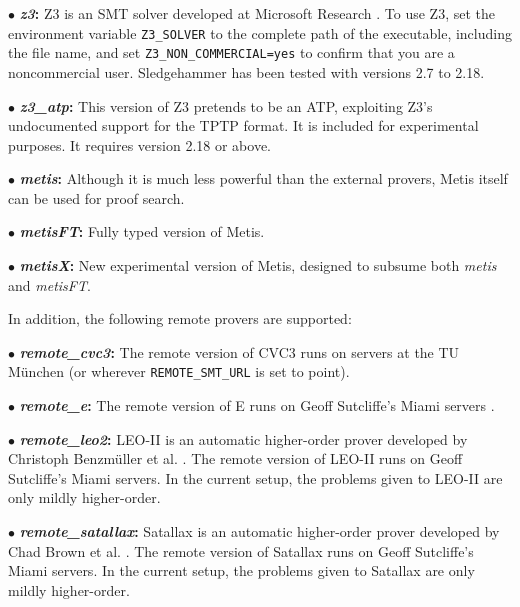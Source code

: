 \documentclass[a4paper,12pt]{article}
\begin{document}
\begin{enum}
\begin{enum}
\item[$\bullet$] \textbf{\textit{z3}:} Z3 is an SMT solver developed at
Microsoft Research \cite{z3}. To use Z3, set the environment variable
\texttt{Z3\_SOLVER} to the complete path of the executable, including the file
name, and set \texttt{Z3\_NON\_COMMERCIAL=yes} to confirm that you are a
noncommercial user. Sledgehammer has been tested with versions 2.7 to 2.18.

\item[$\bullet$] \textbf{\textit{z3\_atp}:} This version of Z3 pretends to be an
ATP, exploiting Z3's undocumented support for the TPTP format. It is included
for experimental purposes. It requires version 2.18 or above.

\item[$\bullet$] \textbf{\textit{metis}:} Although it is much less powerful than
the external provers, Metis itself can be used for proof search.

\item[$\bullet$] \textbf{\textit{metisFT}:} Fully typed version of Metis.

\item[$\bullet$] \textbf{\textit{metisX}:} New experimental version of Metis,
designed to subsume both \textit{metis} and \textit{metisFT}.
\end{enum}

In addition, the following remote provers are supported:

\begin{enum}
\item[$\bullet$] \textbf{\textit{remote\_cvc3}:} The remote version of CVC3 runs
on servers at the TU M\"unchen (or wherever \texttt{REMOTE\_SMT\_URL} is set to
point).

\item[$\bullet$] \textbf{\textit{remote\_e}:} The remote version of E runs
on Geoff Sutcliffe's Miami servers \cite{sutcliffe-2000}.

\item[$\bullet$] \textbf{\textit{remote\_leo2}:} LEO-II is an automatic
higher-order prover developed by Christoph Benzm\"uller et al. \cite{leo2}. The
remote version of LEO-II runs on Geoff Sutcliffe's Miami servers. In the current
setup, the problems given to LEO-II are only mildly higher-order.

\item[$\bullet$] \textbf{\textit{remote\_satallax}:} Satallax is an automatic
higher-order prover developed by Chad Brown et al. \cite{satallax}. The remote
version of Satallax runs on Geoff Sutcliffe's Miami servers. In the current
setup, the problems given to Satallax are only mildly higher-order.


\end{enum}
\end{enum}
\end{document}
